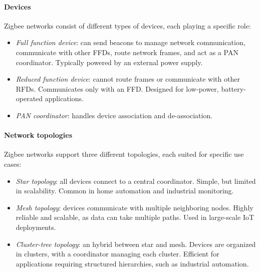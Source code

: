 \paragraph*{Devices}
Zigbee networks consist of different types of devices, each playing a specific role:
\begin{itemize}
    \item \textit{Full function device}: can send beacons to manage network communication, communicate with other FFDs, route network frames, and act as a PAN coordinator. 
        Typically powered by an external power supply.
    \item \textit{Reduced function device}: cannot route frames or communicate with other RFDs.
        Communicates only with an FFD.
        Designed for low-power, battery-operated applications.
    \item \textit{PAN coordinator}: handles device association and de-association.
\end{itemize}

\paragraph*{Network topologies}
Zigbee networks support three different topologies, each suited for specific use cases:
\begin{itemize}
    \item \textit{Star topology}: all devices connect to a central coordinator.
        Simple, but limited in scalability.
        Common in home automation and industrial monitoring.
    \item \textit{Mesh topology}: devices communicate with multiple neighboring nodes.
        Highly reliable and scalable, as data can take multiple paths.
        Used in large-scale IoT deployments.
    \item \textit{Cluster-tree topology}: an hybrid between star and mesh.
        Devices are organized in clusters, with a coordinator managing each cluster.
        Efficient for applications requiring structured hierarchies, such as industrial automation.
\end{itemize}

